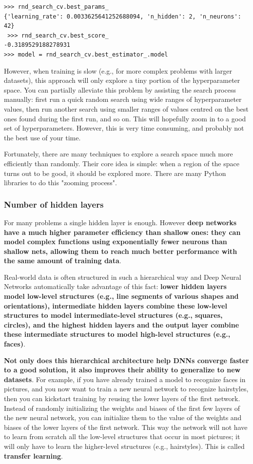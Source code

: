 \documentclass[12pt, letterpaper]{article}
\theoremstyle{definition}
\let\tb\textbf
\begin{document}
\begin{lstlisting}
>>> rnd_search_cv.best_params_
{'learning_rate': 0.0033625641252688094, 'n_hidden': 2, 'n_neurons': 42}
 >>> rnd_search_cv.best_score_
-0.3189529188278931
>>> model = rnd_search_cv.best_estimator_.model
\end{lstlisting}

However, when training is slow (e.g., for more complex problems with larger datasets), this approach will only explore a tiny portion of the hyperparameter space. You can partially alleviate this problem by assisting the search process manually: first run a quick random search using wide ranges of hyperparameter values, then run another search using smaller ranges of values centred on the best ones found during the first run, and so on. This will hopefully zoom in to a good set of hyperparameters. However, this is very time consuming, and probably not the best use of your time.

Fortunately, there are many techniques to explore a search space much more efficiently than randomly. Their core idea is simple: when a region of the space turns out to be good, it should be explored more. There are many Python libraries to do this "zooming process".

\subsubsection{Number of hidden layers}
For many problems a single hidden layer is enough. However \tb{deep networks have a much higher parameter efficiency than shallow ones: they can model complex functions using exponentially fewer neurons than shallow nets, allowing them to reach much better performance with the same amount of training data}.

Real-world data is often structured in such a hierarchical way and Deep Neural Networks automatically take advantage of this fact: \tb{lower hidden layers model low-level structures (e.g., line segments of various shapes and orientations), intermediate hidden layers combine these low-level structures to model intermediate-level structures (e.g., squares, circles), and the highest hidden layers and the output layer combine these intermediate structures to model high-level structures (e.g., faces)}.

\tb{Not only does this hierarchical architecture help DNNs converge faster to a good solution, it also improves their ability to generalize to new datasets}. For example, if you have already trained a model to recognize faces in pictures, and you now want to train a new neural network to recognize hairstyles, then you can kickstart training by reusing the lower layers of the first network. Instead of randomly initializing the weights and biases of the first few layers of the new neural network, you can initialize them to the value of the weights and biases of the lower layers of the first network. This way the network will not have to learn from scratch all the low-level structures that occur in most pictures; it will only have to learn the higher-level structures (e.g., hairstyles). This is called \tb{transfer learning}.
\end{document}
